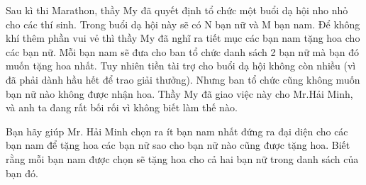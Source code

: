 Sau kì thi Marathon, thầy My đã quyết định tổ chức một buổi dạ hội nho nhỏ cho các thí sinh. Trong buổi dạ hội này sẽ có N bạn nữ và M bạn nam. Để không khí thêm phần vui vẻ thì thầy My đã nghĩ ra tiết mục các bạn nam tặng hoa cho các bạn nữ. Mỗi bạn nam sẽ đưa cho ban tổ chức danh sách 2 bạn nữ mà bạn đó muốn tặng hoa nhất. Tuy nhiên tiền tài trợ cho buổi dạ hội không còn nhiều (vì đã phải dành hầu hết để trao giải thưởng). Nhưng ban tổ chức cũng không muốn bạn nữ nào không được nhận hoa. Thầy My đã giao việc này cho Mr.Hải Minh, và anh ta đang rất bối rối vì không biết làm thế nào.  

   Bạn hãy giúp Mr. Hải Minh chọn ra ít bạn nam nhất đứng ra đại diện cho các bạn nam để tặng hoa các bạn nữ sao cho bạn nữ nào cũng được tặng hoa. Biết rằng mỗi bạn nam được chọn sẽ tặng hoa cho cả hai bạn nữ trong danh sách của bạn đó.